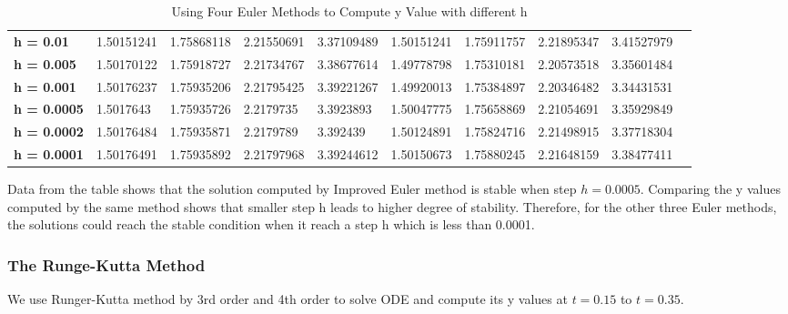 \documentclass[a4paper]{article}
\begin{document}
\begin{table}[H]
{\begin{tabular}{@{}llllllllll@{}}
				\textbf{h = 0.01}   & 1.50151241        & 1.75868118       & 2.21550691       & 3.37109489       & 1.50151241        & 1.75911757       & 2.21895347        & 3.41527979                                                \\
				\textbf{h = 0.005}  & 1.50170122        & 1.75918727       & 2.21734767        & 3.38677614       & 1.49778798        & 1.75310181       & 2.20573518        & 3.35601484                                                  \\
				\textbf{h = 0.001}  & 1.50176237        & 1.75935206       & 2.21795425        & 3.39221267       & 1.49920013        & 1.75384897       & 2.20346482        & 3.34431531                                                  \\
				\textbf{h = 0.0005} & 1.5017643         & 1.75935726       & 2.2179735         & 3.3923893       & 1.50047775         & 1.75658869       & 2.21054691         & 3.35929849                                                  \\
				\textbf{h = 0.0002} & 1.50176484        & 1.75935871       & 2.2179789        & 3.392439       & 1.50124891        & 1.75824716       & 2.21498915        & 3.37718304                                                  \\
				\textbf{h = 0.0001} & 1.50176491        & 1.75935892       & 2.21797968        & 3.39244612       & 1.50150673        & 1.75880245       & 2.21648159        & 3.38477411      \\ 
				\bottomrule
			\end{tabular}%
		}
		\caption{Using Four Euler Methods to Compute y Value with different h }
		\label{tab:IVP2_Euler1}
	\end{table}
	
	Data from the table shows that the solution computed by Improved Euler method is stable when step $h = 0.0005$. Comparing the y values computed by the same method shows that smaller step h leads to higher degree of stability. Therefore, for the other three Euler methods, the solutions could reach the stable condition when it reach a step h which is less than 0.0001. 
	
	\subsubsection{The Runge-Kutta Method}
	
	We use Runger-Kutta method by 3rd order and 4th order to solve ODE and compute its y values at $t = 0.15$ to $t = 0.35$. 
	
\end{document}
